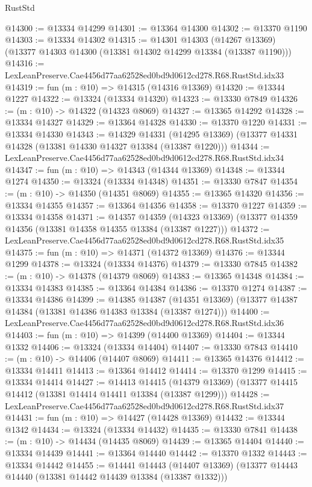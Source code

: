\begin{lexlean}{RustStd}
\begin{coremodule}
@14300 := @13334 @14299
@14301 := @13364 @14300
@14302 := @13370 @1190
@14303 := @13334 @14302
@14315 := @14301
    @14303
    (@14267 @13369)
    (@13377 @14303 @14300 (@13381 @14302 @14299 @13384 (@13387 @1190)))
@14316 := LexLeanPreserve.Cae4456d77aa62528ed0bd9d0612cd278.R68.RustStd.idx33
@14319 := fun (m : @10) => @14315 (@14316 @13369)
@14320 := @13344 @1227
@14322 := @13324 (@13334 @14320)
@14323 := @13330 @7849
@14326 := (m : @10) -> @14322 (@14323 @8069)
@14327 := @13365 @14292
@14328 := @13334 @14327
@14329 := @13364 @14328
@14330 := @13370 @1220
@14331 := @13334 @14330
@14343 := @14329
    @14331
    (@14295 @13369)
    (@13377 @14331 @14328 (@13381 @14330 @14327 @13384 (@13387 @1220)))
@14344 := LexLeanPreserve.Cae4456d77aa62528ed0bd9d0612cd278.R68.RustStd.idx34
@14347 := fun (m : @10) => @14343 (@14344 @13369)
@14348 := @13344 @1274
@14350 := @13324 (@13334 @14348)
@14351 := @13330 @7847
@14354 := (m : @10) -> @14350 (@14351 @8069)
@14355 := @13365 @14320
@14356 := @13334 @14355
@14357 := @13364 @14356
@14358 := @13370 @1227
@14359 := @13334 @14358
@14371 := @14357
    @14359
    (@14323 @13369)
    (@13377 @14359 @14356 (@13381 @14358 @14355 @13384 (@13387 @1227)))
@14372 := LexLeanPreserve.Cae4456d77aa62528ed0bd9d0612cd278.R68.RustStd.idx35
@14375 := fun (m : @10) => @14371 (@14372 @13369)
@14376 := @13344 @1299
@14378 := @13324 (@13334 @14376)
@14379 := @13330 @7845
@14382 := (m : @10) -> @14378 (@14379 @8069)
@14383 := @13365 @14348
@14384 := @13334 @14383
@14385 := @13364 @14384
@14386 := @13370 @1274
@14387 := @13334 @14386
@14399 := @14385
    @14387
    (@14351 @13369)
    (@13377 @14387 @14384 (@13381 @14386 @14383 @13384 (@13387 @1274)))
@14400 := LexLeanPreserve.Cae4456d77aa62528ed0bd9d0612cd278.R68.RustStd.idx36
@14403 := fun (m : @10) => @14399 (@14400 @13369)
@14404 := @13344 @1332
@14406 := @13324 (@13334 @14404)
@14407 := @13330 @7843
@14410 := (m : @10) -> @14406 (@14407 @8069)
@14411 := @13365 @14376
@14412 := @13334 @14411
@14413 := @13364 @14412
@14414 := @13370 @1299
@14415 := @13334 @14414
@14427 := @14413
    @14415
    (@14379 @13369)
    (@13377 @14415 @14412 (@13381 @14414 @14411 @13384 (@13387 @1299)))
@14428 := LexLeanPreserve.Cae4456d77aa62528ed0bd9d0612cd278.R68.RustStd.idx37
@14431 := fun (m : @10) => @14427 (@14428 @13369)
@14432 := @13344 @1342
@14434 := @13324 (@13334 @14432)
@14435 := @13330 @7841
@14438 := (m : @10) -> @14434 (@14435 @8069)
@14439 := @13365 @14404
@14440 := @13334 @14439
@14441 := @13364 @14440
@14442 := @13370 @1332
@14443 := @13334 @14442
@14455 := @14441
    @14443
    (@14407 @13369)
    (@13377 @14443 @14440 (@13381 @14442 @14439 @13384 (@13387 @1332)))

\end{coremodule}
\end{lexlean}
